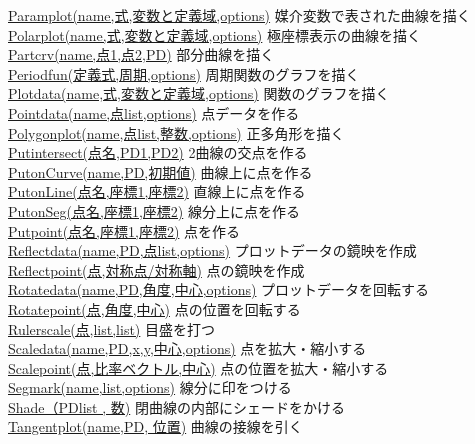 \documentclass[papersize,a4paper,12pt,uplatex]{jsarticle}
\begin{document}
\begin{tabbing}
\hyperlink{paramplot}{Paramplot(name,式,変数と定義域,options)}  \>媒介変数で表された曲線を描く\\
\hyperlink{polarplot}{Polarplot(name,式,変数と定義域,options)}  \>極座標表示の曲線を描く\\\hyperlink{partcrv}{Partcrv(name,点1,点2,PD)}    \>部分曲線を描く\\
\hyperlink{periodfun}{Periodfun(定義式,周期,options)}    \>周期関数のグラフを描く\\
\hyperlink{plotdata}{Plotdata(name,式,変数と定義域,options)}    \>関数のグラフを描く\\
\hyperlink{pointdata}{Pointdata(name,点list,options)}  \>点データを作る\\
\hyperlink{polygonplot}{Polygonplot(name,点list,整数,options)}  \>正多角形を描く\\
\hyperlink{putintersect}{Putintersect(点名,PD1,PD2)}  \>2曲線の交点を作る\\
\hyperlink{putoncurve}{PutonCurve(name,PD,初期値)}  \>曲線上に点を作る\\
\hyperlink{putonline}{PutonLine(点名,座標1,座標2)}      \>直線上に点を作る\\
\hyperlink{putonseg}{PutonSeg(点名,座標1,座標2)}      \>線分上に点を作る\\
\hyperlink{putpoint}{Putpoint(点名,座標1,座標2)}      \>点を作る\\
\hyperlink{reflectdata}{Reflectdata(name,PD,点list,options)}  \>プロットデータの鏡映を作成\\
\hyperlink{reflectpoint}{Reflectpoint(点,対称点/対称軸)}  \>点の鏡映を作成\\
\hyperlink{rotatedata}{Rotatedata(name,PD,角度,中心,options)}  \>プロットデータを回転する\\
\hyperlink{rotatepoint}{Rotatepoint(点,角度,中心)}  \>点の位置を回転する\\
\hyperlink{rulerscale}{Rulerscale(点,list,list)}  \>目盛を打つ\\
\hyperlink{scaledata}{Scaledata(name,PD,x,y,中心,options)}   \>点を拡大・縮小する\\
\hyperlink{scalepoint}{Scalepoint(点,比率ベクトル,中心)}   \>点の位置を拡大・縮小する\\
\hyperlink{drawsegmark}{Segmark(name,list,options)}  \>線分に印をつける\\
\hyperlink{shade}{Shade（PDlist , 数)}      \>閉曲線の内部にシェードをかける\\
\hyperlink{tangentplot}{Tangentplot(name,PD, 位置)}      \>曲線の接線を引く\\

\end{tabbing}
\end{document}
